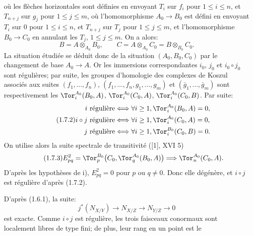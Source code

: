où les
flèches horizontales sont définies en envoyant $T_i$ sur $f_i$ pour $1\leq i\leq n$, et $T_{n+j}$ sur $g_j$ pour $1\leq j\leq m$, où l'homomorphisme $A_0\longrightarrow B_0$ est défini en envoyant $T_i$ sur $0$ pour $1\leq i\leq n$, et $T_{n+j}$ sur $T_j$ pour $1\leq j\leq m$, et l'homomorphisme $B_0\longrightarrow C_0$ en annulant les $T_j$, $1\leq j\leq m$. On a alors:
\[
 B=A\otimes_{A_0}B_0,
 \qquad
 C=A\otimes_{A_0}C_0=B\otimes_{B_0}C_0.
\]
La situation étudiée se déduit donc de la situation $(A_0,B_0,C_0)$ par le changement de base $A_0\longrightarrow A$. Or les immersions correspondantes $i_0$, $j_0$ et $i_0\circ j_0$ sont régulières; par suite, les groupes d'homologie des complexes de Koszul associés aux suites $(f_1,\ldots,f_n)$, $(f_1,\ldots,f_n,g_1,\ldots,g_m)$ et $(\bar g_1,\ldots,\bar g_m)$ sont respectivement les $\Tor_i^{A_0}(B_0,A)$, $\Tor_i^{A_0}(C_0,A)$, $\Tor_i^{A_0}(C_0,B)$. Par suite:
\begin{equation}\tag{1.7.2}
\begin{aligned}
 i\ \text{régulière} &\Longleftrightarrow \forall i\geq1,
 \Tor_i^{A_0}(B_0,A)=0,\\
 i\circ j\ \text{régulière} &\Longleftrightarrow \forall i\geq1,
 \Tor_i^{A_0}(C_0,A)=0,\\
 j\ \text{régulière} &\Longleftrightarrow \forall i\geq1,
 \Tor_i^{B_0}(C_0,B)=0.
\end{aligned}
\end{equation}
On utilise alors la suite spectrale de transitivité ([1], XVI 5)
\begin{equation}\tag{1.7.3}
E^2_{pq}=\Tor_p^{B_0}\bigl(C_0,\Tor_q^{A_0}(B_0,A)\bigr)
\Longrightarrow \Tor_n^{A_0}(C_0,A).
\end{equation}
D'après les hypothèses de i), $E^2_{pq}=0$ pour $p$ ou $q\ne0$. Donc elle dégénère, et $i\circ j$ est régulière d'après (1.7.2).

D'après (1.6.1), la suite:
\[
 j^*(N_{X/Y})\longrightarrow N_{X/Z}\longrightarrow N_{Y/Z}\longrightarrow0
\]
est exacte. Comme $i\circ j$ est régulière, les trois faisceaux conormaux sont localement libres de type fini; de plus, leur rang en un point est le
